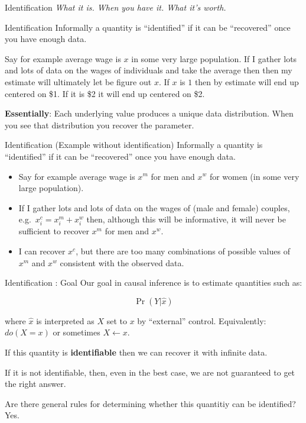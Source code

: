 \documentclass[
  11pt,
  ignorenonframetext,
]{beamer}
\providecommand{\tightlist}{%
  \setlength{\itemsep}{0pt}\setlength{\parskip}{0pt}}\usepackage{longtable,booktabs,array}
\begin{document}
\begin{frame}{Identification}
\emph{What it is. When you have it. What it's worth.}
\end{frame}

\begin{frame}{Identification}
\protect\hypertarget{identification-1}{}
Informally a quantity is ``identified'' if it can be ``recovered'' once
you have enough data.

Say for example average wage is \(x\) in some very large population. If
I gather lots and lots of data on the wages of individuals and take the
average then then my estimate will ultimately let be figure out \(x\).
If \(x\) is \(1\) then by estimate will end up centered on \$1. If it is
\$2 it will end up centered on \$2.

\textbf{Essentially}: Each underlying value produces a unique data
distribution. When you see that distribution you recover the parameter.
\end{frame}

\begin{frame}{Identification (Example without identification)}
\protect\hypertarget{identification-example-without-identification}{}
Informally a quantity is ``identified'' if it can be ``recovered'' once
you have enough data.

\begin{itemize}
\tightlist
\item
  Say for example average wage is \(x^m\) for men and \(x^w\) for women
  (in some very large population).
\item
  If I gather lots and lots of data on the wages of (male and female)
  couples, e.g.~\(x^c_i = x^m_i + x^w_i\) then, although this will be
  informative, it will never be sufficient to recover \(x^m\) for men
  and \(x^w\).
\item
  I can recover \(x^c\), but there are too many combinations of possible
  values of \(x^m\) and \(x^w\) consistent with the observed data.
\end{itemize}
\end{frame}

\begin{frame}{Identification : Goal}
\protect\hypertarget{identification-goal}{}
Our goal in causal inference is to estimate quantities such as:

\[\Pr(Y|\hat{x})\]

where \(\hat{x}\) is interpreted as \(X\) set to \(x\) by ``external''
control. Equivalently: \(do(X=x)\) or sometimes \(X \leftarrow x\).

If this quantity is \textbf{identifiable} then we can recover it with
infinite data.

If it is not identifiable, then, even in the best case, we are not
guaranteed to get the right answer.

Are there general rules for determining whether this quantitiy can be
identified? Yes.
\end{frame}
\end{document}
